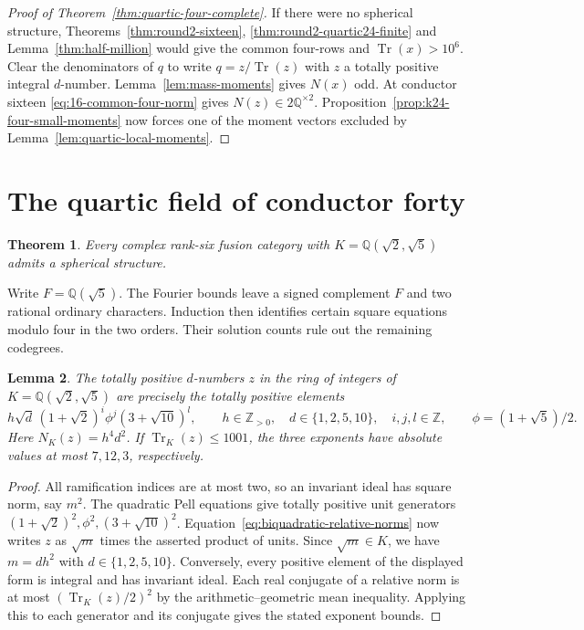 \documentclass[11pt,reqno]{amsart}
\newtheorem{theorem}{Theorem}[section]
\newtheorem{lemma}[theorem]{Lemma}
\theoremstyle{remark}\newtheorem{remark}[theorem]{Remark}
\numberwithin{equation}{section}
\begin{document}
\begin{proof}[Proof of Theorem~\ref{thm:quartic-four-complete}]
If there were no spherical structure, Theorems~\ref{thm:round2-sixteen},
\ref{thm:round2-quartic24-finite} and Lemma~\ref{thm:half-million} would
give the common four-rows and $\operatorname{Tr}(x)>10^6$.
Clear the denominators of $q$ to write $q=z/\operatorname{Tr}(z)$
with $z$ a totally positive integral $d$-number. Lemma~\ref{lem:mass-moments} gives $N(x)$ odd. At conductor sixteen \eqref{eq:16-common-four-norm} gives
$N(z)\in2\mathbb Q^{\times2}$.
Proposition~\ref{prop:k24-four-small-moments} now forces one of the
moment vectors excluded by Lemma~\ref{lem:quartic-local-moments}.
\end{proof}

\section{The quartic field of conductor forty}
\begin{theorem}\label{thm:forty-closed}
Every complex rank-six fusion category with $K=\mathbb Q(\sqrt2,\sqrt5)$ admits a spherical structure.
\end{theorem}
Write $F=\mathbb Q(\sqrt5)$. The Fourier bounds leave a signed
complement $F$ and two rational ordinary characters. Induction then
identifies certain square equations modulo four in the two orders.
Their solution counts rule out the remaining codegrees.
\begin{lemma}\label{lem:forty-unit-param}
The totally positive $d$-numbers $z$ in the ring of integers of
$K=\mathbb Q(\sqrt2,\sqrt5)$ are precisely the totally positive elements
\[
 h\sqrt d\, (1+\sqrt2)^i\phi^j(3+\sqrt{10})^l,\qquad
 h\in\mathbb Z_{>0},\quad d\in\{1,2,5,10\},\quad i,j,l\in\mathbb Z ,
 \qquad \phi=(1+\sqrt5)/2 .
\]
Here $N_K(z)=h^4d^2$. If $\operatorname{Tr}_K(z)\le1001$, the three
exponents have absolute values at most $7,12,3$, respectively.
\end{lemma}
\begin{proof}
All ramification indices are at most two, so an invariant ideal has
square norm, say $m^2$. The quadratic Pell equations give totally
positive unit generators $(1+\sqrt2)^2,\phi^2,(3+\sqrt{10})^2$.
Equation~\eqref{eq:biquadratic-relative-norms} now writes $z$ as
$\sqrt m$ times the asserted product of units. Since $\sqrt m\in K$,
we have $m=dh^2$ with $d\in\{1,2,5,10\}$. Conversely, every positive
element of the displayed form is integral and has invariant ideal.
Each real conjugate of a relative norm is at most
$(\operatorname{Tr}_K(z)/2)^2$ by the arithmetic--geometric mean
inequality. Applying this to each generator and its conjugate gives
the stated exponent bounds.
\end{proof}
\end{document}
